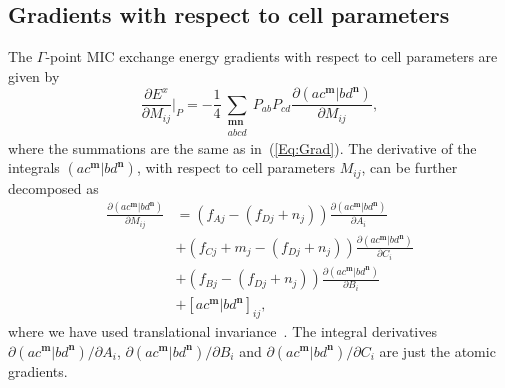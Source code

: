 \documentclass[prl,twocolumn,showpacs,twocolumngrid,superbib]{revtex4}
\begin{document}
\subsection{Gradients with respect to cell parameters}
The $\Gamma$-point MIC exchange energy gradients with respect to cell parameters are given by
\begin{equation}\label{Eq:Xstress}
  \frac{\partial E^x}{\partial M_{ij}}\bigg|_P=
  -\frac{1}{4}\sum_{\substack{\mathbf{m}\mathbf{n}\\a b c d}}P_{ab}P_{cd}
  \frac{\partial(ac^\mathbf{m}|bd^\mathbf{n})}{\partial M_{ij}},
\end{equation}
where the summations are the same as in~(\ref{Eq:Grad}).
The derivative of the integrals $(ac^\mathbf{m}|bd^\mathbf{n})$, with respect 
to cell parameters $M_{ij}$, can be further decomposed as
\begin{equation}\label{Eq:DerMij}
  \begin{split}
    \frac{\partial (ac^\mathbf{m}|bd^\mathbf{n})}{\partial M_{ij}}
    &=(f_{Aj}-(f_{Dj}+n_j))\frac{\partial (ac^\mathbf{m}|bd^\mathbf{n})}{\partial A_{i}}\\
    &+(f_{Cj}+m_j-(f_{Dj}+n_j))\frac{\partial (ac^\mathbf{m}|bd^\mathbf{n})}{\partial C_{i}}\\
    &+(f_{Bj}-(f_{Dj}+n_j))\frac{\partial (ac^\mathbf{m}|bd^\mathbf{n})}{\partial B_{i}}\\
    &+[ac^\mathbf{m}|bd^\mathbf{n}]_{ij},
  \end{split}
\end{equation}
where we have used translational invariance~\cite{AKorminicki77}. 
The integral derivatives $\partial (ac^\mathbf{m}|bd^\mathbf{n})/\partial A_{i}$, 
$\partial (ac^\mathbf{m}|bd^\mathbf{n})/\partial B_{i}$ and 
$\partial (ac^\mathbf{m}|bd^\mathbf{n})/\partial C_{i}$ are just the atomic gradients.
\end{document}
